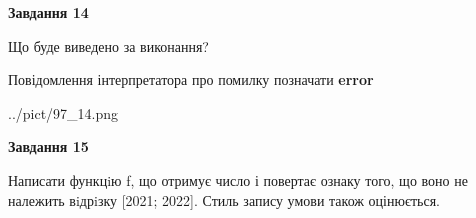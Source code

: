 \documentclass[11pt, ukrainian]{article}
\begin{document}
{\begin {large}
{\begin {center}\textbf{Завдання 14}\end {center}}\par
Що буде виведено за виконання? \par
Повідомлення інтерпретатора про помилку позначати \textbf{error}

\begin{center}
	{../pict/97_14.png}
\end{center}
\newpage

{\begin {center}\textbf{Завдання 15}\end {center}}\par

Написати функцiю f, що отримує число і повертає ознаку того, що воно не належить вiдрiзку [2021; 2022]. Стиль запису умови також оцінюється.\par
\newpage

\end {large}}
\end{document}
